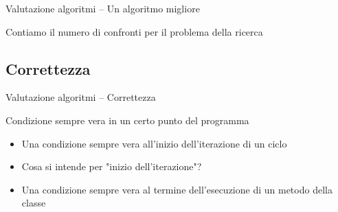 \begin{frame}[shrink=10]{Valutazione algoritmi -- Un algoritmo migliore}

\vspace{-9pt}
\begin{mybox}
Contiamo il numero di confronti per il problema della \alert{ricerca}
\end{mybox}

\vspace{-12pt}

\end{frame}



\subsection{Correttezza}

\begin{frame}{Valutazione algoritmi -- Correttezza}

\vspace{-9pt}
\begin{myboxtitle}[Invariante]
Condizione sempre vera in un certo punto del programma
\end{myboxtitle}

\begin{myboxtitle}
\begin{itemize}
\item Una condizione sempre vera all'inizio dell'iterazione di un ciclo
\item Cosa si intende per "inizio dell'iterazione"?
\end{itemize}
\end{myboxtitle}

\begin{myboxtitle}
\begin{itemize}
\item Una condizione sempre vera al termine dell'esecuzione di un metodo della classe
\end{itemize}
\end{myboxtitle}

\end{frame}

